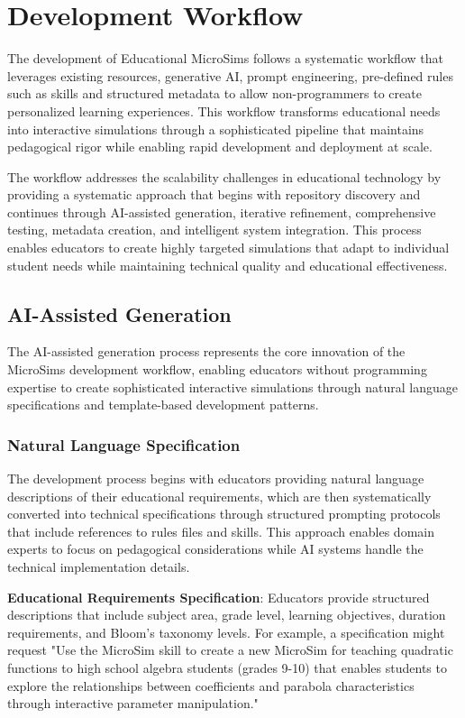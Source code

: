 \section{Development Workflow}
\label{sec:workflow}

The development of Educational MicroSims follows a systematic workflow that leverages existing resources, generative AI, prompt engineering, pre-defined rules such as skills and structured metadata to allow non-programmers to create personalized learning experiences. This workflow transforms educational needs into interactive simulations through a sophisticated pipeline that maintains pedagogical rigor while enabling rapid development and deployment at scale.

The workflow addresses the scalability challenges in educational technology by providing a systematic approach that begins with repository discovery and continues through AI-assisted generation, iterative refinement, comprehensive testing, metadata creation, and intelligent system integration. This process enables educators to create highly targeted simulations that adapt to individual student needs while maintaining technical quality and educational effectiveness.

\subsection{AI-Assisted Generation}

The AI-assisted generation process represents the core innovation of the MicroSims development workflow, enabling educators without programming expertise to create sophisticated interactive simulations through natural language specifications and template-based development patterns.

\subsubsection{Natural Language Specification}

The development process begins with educators providing natural language descriptions of their educational requirements, which are then systematically converted into technical specifications through structured prompting protocols that include references to rules files and skills. This approach enables domain experts to focus on pedagogical considerations while AI systems handle the technical implementation details.

\textbf{Educational Requirements Specification}: Educators provide structured descriptions that include subject area, grade level, learning objectives, duration requirements, and Bloom's taxonomy levels. For example, a specification might request "Use the MicroSim skill to create a new MicroSim for teaching quadratic functions to high school algebra students (grades 9-10) that enables students to explore the relationships between coefficients and parabola characteristics through interactive parameter manipulation."

